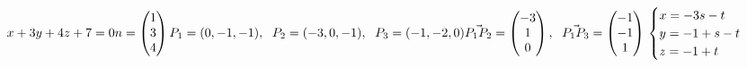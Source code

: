 \subsection{}
\begin{math}
    x+3y+4z+7=0
    \\
    n=\begin{pmatrix}
        1\\
        3\\
        4
    \end{pmatrix}
    \\
    P_1=(0,-1,-1),
    \hspace{6px}
    P_2=(-3,0,-1),
    \hspace{6px}
    P_3=(-1,-2,0)
    \\
    \vec{P_1P_2}=\begin{pmatrix}
        -3\\
        1\\
        0
    \end{pmatrix},
    \hspace{6px}
    \vec{P_1P_3}=\begin{pmatrix}
        -1\\
        -1\\
        1
    \end{pmatrix}
    \\
    \begin{cases}
        x=-3s-t\\
        y=-1+s-t\\
        z=-1+t
    \end{cases}
\end{math}